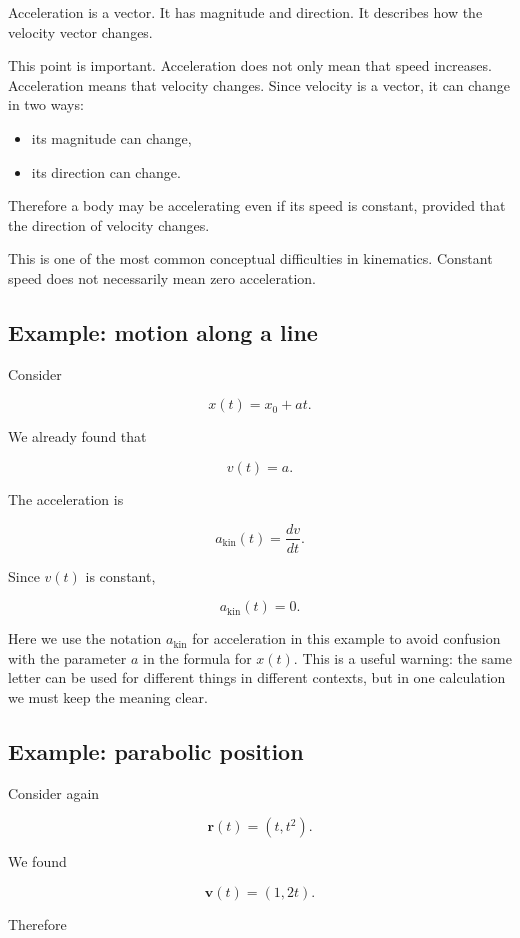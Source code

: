 Acceleration is a vector. It has magnitude and direction. It describes how the velocity vector changes.

This point is important. Acceleration does not only mean that speed increases. Acceleration means that velocity changes. Since velocity is a vector, it can change in two ways:

\begin{itemize}
    \item its magnitude can change,
    \item its direction can change.
\end{itemize}

Therefore a body may be accelerating even if its speed is constant, provided that the direction of velocity changes.

This is one of the most common conceptual difficulties in kinematics. Constant speed does not necessarily mean zero acceleration.

\subsection{Example: motion along a line}

Consider

\[
x(t)=x_0+at.
\]

We already found that

\[
v(t)=a.
\]

The acceleration is

\[
a_{\mathrm{kin}}(t)=\frac{dv}{dt}.
\]

Since \(v(t)\) is constant,

\[
a_{\mathrm{kin}}(t)=0.
\]

Here we use the notation \(a_{\mathrm{kin}}\) for acceleration in this example to avoid confusion with the parameter \(a\) in the formula for \(x(t)\). This is a useful warning: the same letter can be used for different things in different contexts, but in one calculation we must keep the meaning clear.

\subsection{Example: parabolic position}

Consider again

\[
\mathbf{r}(t)=(t,t^2).
\]

We found

\[
\mathbf{v}(t)=(1,2t).
\]

Therefore

